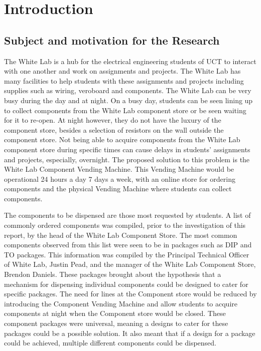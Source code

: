 \documentclass[a4paper,11pt]{article}
\numberwithin{figure}{section}
\numberwithin{table}{section}
\begin{document}
	
	
	
		
	\newpage
	
	\newpage
	\newpage
	
\pagestyle{mypage}
\section{Introduction}\thispagestyle{sectionstart}
	\subsection{Subject and motivation for the Research}
The White Lab is a hub for the electrical engineering students of UCT to interact with one another and work on assignments and projects. The White Lab has many facilities to help students with these assignments and projects including supplies such as wiring, veroboard and components. The White Lab can be very busy during the day and at night. On a busy day, students can be seen lining up to collect components from the White Lab component store or be seen waiting for it to re-open. At night however, they do not have the luxury of the component store, besides a selection of resistors on the wall outside the component store. Not being able to acquire components from the White Lab component store during specific times can cause delays in students' assignments and projects, especially, overnight. The proposed solution to this problem is the White Lab Component Vending Machine. This Vending Machine would be operational 24 hours a day 7 days a week, with an online store for ordering components and the physical Vending Machine where students can collect components. 

The components to be dispensed are those most requested by students. A list of commonly ordered components was compiled, prior to the investigation of this report, by the head of the White Lab Component Store. The most common components observed from this list were seen to be in packages such as DIP and TO packages. This information was compiled by the Principal Technical Officer of White Lab, Justin Pead, and the manager of the White Lab Component Store, Brendon Daniels. These packages brought about the hypothesis that a mechanism for dispensing individual components could be designed to cater for specific packages. The need for lines at the Component store would be reduced by introducing the Component Vending Machine and allow students to acquire components at night when the Component store would be closed. These component packages were universal, meaning a designs to cater for these packages could be a possible solution. It also meant that if a design for a package could be achieved, multiple different components could be dispensed.
\end{document}
